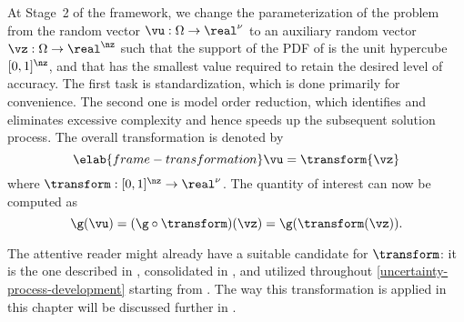 At Stage~2 of the framework, we change the parameterization of the problem from
the random vector $\vu: \Omega \to \real^\nu$ to an auxiliary random vector
$\vz: \Omega \to \real^\nz$ such that the support of the \ac{PDF} of \vz is the
unit hypercube $[0, 1]^\nz$, and that \nz has the smallest value required to
retain the desired level of accuracy. The first task is standardization, which
is done primarily for convenience. The second one is model order reduction,
which identifies and eliminates excessive complexity and hence speeds up the
subsequent solution process. The overall transformation is denoted by
\begin{equation} \elab{frame-transformation}
  \vu = \transform{\vz}
\end{equation}
where $\transform: [0, 1]^\nz \to \real^\nu$. The quantity of interest \g can
now be computed as
\[
  \g(\vu) = (\g \circ \transform)(\vz) = \g(\transform(\vz)).
\]

The attentive reader might already have a suitable candidate for $\transform$:
it is the one described in , consolidated in
, and utilized throughout
\cref{uncertainty-process-development} starting from
. The way this transformation is applied in this
chapter will be discussed further in .
